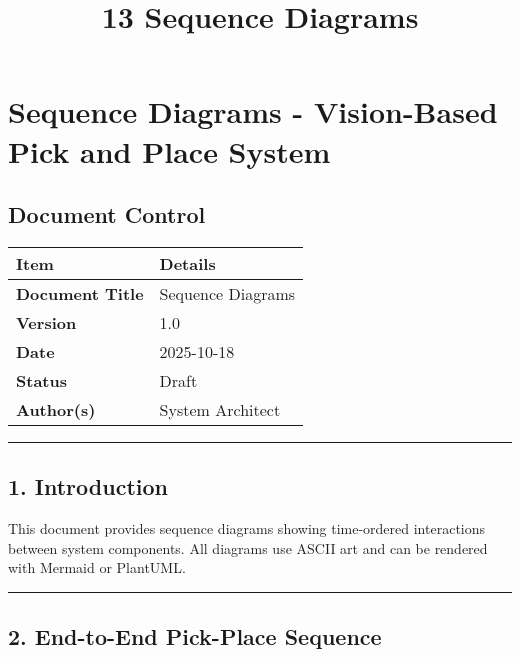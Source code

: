 \documentclass[
]{article}
\title{13 Sequence Diagrams}
\author{}
\date{}
\begin{document}
\maketitle

{
\setcounter{tocdepth}{3}
\tableofcontents
}
\hypertarget{sequence-diagrams---vision-based-pick-and-place-system}{%
\section{Sequence Diagrams - Vision-Based Pick and Place
System}\label{sequence-diagrams---vision-based-pick-and-place-system}}

\hypertarget{document-control}{%
\subsection{Document Control}\label{document-control}}

\begin{longtable}[]{@{}ll@{}}
\toprule\noalign{}
\textbf{Item} & \textbf{Details} \\
\midrule\noalign{}
\endhead
\bottomrule\noalign{}
\endlastfoot
\textbf{Document Title} & Sequence Diagrams \\
\textbf{Version} & 1.0 \\
\textbf{Date} & 2025-10-18 \\
\textbf{Status} & Draft \\
\textbf{Author(s)} & System Architect \\
\end{longtable}

\begin{center}\rule{0.5\linewidth}{0.5pt}\end{center}

\hypertarget{introduction}{%
\subsection{1. Introduction}\label{introduction}}

This document provides sequence diagrams showing time-ordered
interactions between system components. All diagrams use ASCII art and
can be rendered with Mermaid or PlantUML.

\begin{center}\rule{0.5\linewidth}{0.5pt}\end{center}

\hypertarget{end-to-end-pick-place-sequence}{%
\subsection{2. End-to-End Pick-Place
Sequence}\label{end-to-end-pick-place-sequence}}
\end{document}
